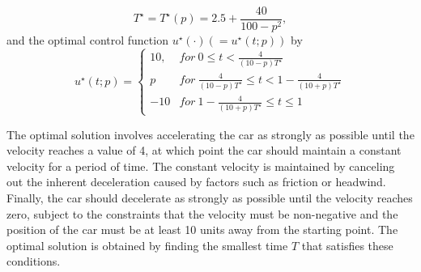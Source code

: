 \documentclass  [
  paper    = a4,
  BCOR     = 10mm,
  twoside,
  fontsize = 12pt,
  fleqn,
  toc      = bibnumbered,
  toc      = listofnumbered,
  numbers  = noendperiod,
  headings = normal,
  listof   = leveldown,
  version  = 3.03
]                                       {scrreprt}
\newcommand{\<}{\langle}
\renewcommand{\>}{\rangle}
\begin{document}
\begin{equation}
	T^\star = T^\star(p) = 2.5 + \frac{40}{100-p^2},
	\label{eq_Theory_T}
\end{equation}
and the optimal control function $u^\star(\cdot) (= u^\star(t; p))$ by 
\begin{equation}
	u^\star(t;p) =     \left\{
	\begin{array}{ll}
		10, & for \  0 \leq t <  \frac{4}{(10-p)T^\star}\\
		p  &  for \ \frac{4}{(10-p)T^\star} \leq t < 1- \frac{4}{(10+p)T^\star} \\
		-10  & for \  1- \frac{4}{(10+p)T^\star} \leq t \leq 1 
	\end{array}
	\right.
	\label{eq_Theory_u}
\end{equation}

The optimal solution involves accelerating the car as strongly as possible until the velocity reaches a value of 4, at which point the car should maintain a constant velocity for a period of time. The constant velocity is maintained by canceling out the inherent deceleration caused by factors such as friction or headwind. Finally, the car should decelerate as strongly as possible until the velocity reaches zero, subject to the constraints that the velocity must be non-negative and the position of the car must be at least 10 units away from the starting point. The optimal solution is obtained by finding the smallest time $T$ that satisfies these conditions.

\end{document}
